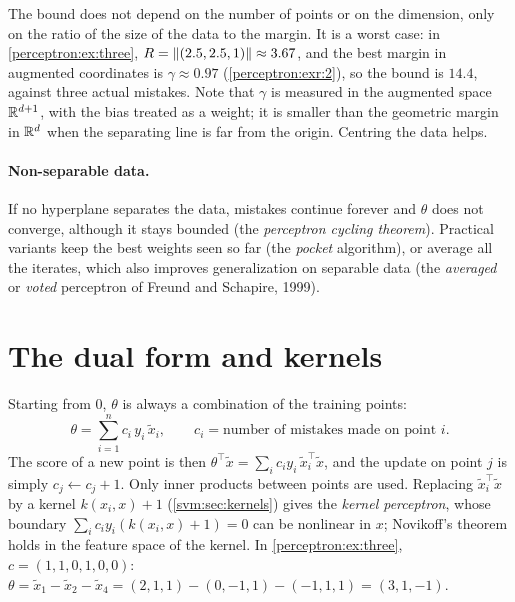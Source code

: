 \begin{notechapter}
The bound does not depend on the number of points or on the dimension, only on the
ratio of the size of the data to the margin. It is a worst case: in
\cref{perceptron:ex:three}, $R = \left\|(2.5, 2.5, 1)\right\|\approx3.67$, and the best margin in augmented
coordinates is $\gamma\approx0.97$ (\cref{perceptron:exr:2}), so the bound is $14.4$, against three
actual mistakes. Note that $\gamma$ is measured in the augmented space $\mathbb{R}^{d+1}$, with the bias
treated as a weight; it is smaller than the geometric margin in $\mathbb{R}^d$ when the
separating line is far from the origin. Centring the data helps.

\paragraph{Non-separable data.} If no hyperplane separates the data, mistakes
continue forever and $\theta$ does not converge, although it stays bounded (the
\emph{perceptron cycling theorem}). Practical variants keep the best weights seen
so far (the \emph{pocket} algorithm), or average all the iterates, which also
improves generalization on separable data (the \emph{averaged} or \emph{voted}
perceptron of Freund and Schapire, 1999).

\section{The dual form and kernels}\label{perceptron:sec:dual}

Starting from $0$, $\theta$ is always a combination of the training points:
\[
  \theta = \sum_{i=1}^nc_i\,y_i\,\tilde x_i,\qquad c_i = \text{number of mistakes made on point }i .
\]
The score of a new point is then $\theta^\top\tilde x = \sum_ic_iy_i\,\tilde x_i^\top\tilde x$, and the update on point $j$ is
simply $c_j\leftarrow c_j + 1$. Only inner products between points are used. Replacing
$\tilde x_i^\top\tilde x$ by a kernel $k(x_i, x) + 1$ (\cref{svm:sec:kernels}) gives the \emph{kernel perceptron},
whose boundary $\sum_ic_iy_i(k(x_i, x) + 1) = 0$ can be nonlinear in $x$; Novikoff's theorem holds in the
feature space of the kernel. In \cref{perceptron:ex:three}, $c = (1, 1, 0, 1, 0, 0)$:
$\theta = \tilde x_1 - \tilde x_2 - \tilde x_4 = (2, 1, 1) - (0, -1, 1) - (-1, 1, 1) = (3, 1, -1)$.


\end{notechapter}
